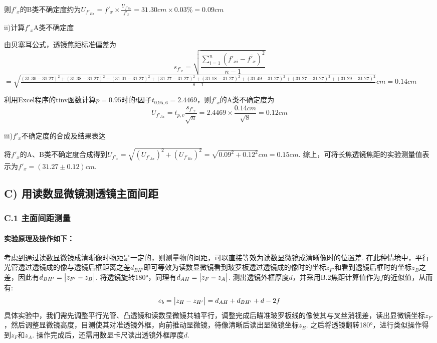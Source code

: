 \documentclass[UTF8]{ctexart}
\begin{document}
 则$f'_x$的B类不确定度约为$U_{f'_{Bx}}=f'_x\times \frac{U_{f'_{Bx}}}{f'_x}=31.30cm\times0.03\%=0.09cm$\\\par
 ii)计算$f'_x$A类不确定度\par 
由贝塞耳公式，透镜焦距标准偏差为
\[s_{f'_x}=\sqrt{\frac{\sum_{i=1}^{n}(f'_{xi}-\overline{f'_x})^2}{n-1}}\]
{\quad\small{$=\sqrt{\frac{(31.30-31.27)^2+(31.38-31.27)^2+(31.01-31.27)^2+(31.27-31.27)^2+(31.18-31.27)^2+(31.49-31.27)^2+(31.27-31.27)^2+(31.29-31.27)^2}{8-1}}cm=0.14cm$}}\par\vspace{0.5em}
利用Excel程序的tinv函数计算$p = 0.95$时的$t$因子$t_{0.95,6}=2.4469$，则$f'_x$的A类不确定度为\[U_{f'_{Ax}}=t_{p,v}\frac{s_{f'_x}}{\sqrt{n}}=2.4469\times\frac{0.14cm}{\sqrt{8}}=0.12cm\]\par
iii)$f'_x$不确定度的合成及结果表达\par
将$f'_x$的A、B类不确定度合成得到$\displaystyle{U_{f'_{x}}=\sqrt{(U_{f'_{Ax}})^2+(U_{f'_{Bx}})^2}=\sqrt{0.09^2+0.12^2}cm=0.15cm}$. 综上，可将长焦透镜焦距的实验测量值表示为$f'_x=(31.27\pm0.12)cm$.

\subsection*{ C) 用读数显微镜测透镜主面间距}
\subsubsection*{C.1 主面间距测量}
\paragraph{实验原理及操作如下：}\quad\par
考虑到通过读数显微镜成清晰像时物距是一定的，则测量物的间距，可以直接等效为读数显微镜成清晰像时的位置差. 在此种情境中，平行光管透过透镜成的像与透镜后框距离之差$d_{BH'}$即可等效为读数显微镜看到玻罗板透过透镜成的像时的坐标$z_{F'}$和看到透镜后框时的坐标$z_{B}$之差，因此有$d_{BH'}=\big{|}z_{F'}-z_{B}\big{|}$. 将透镜旋转180°，同理有$d_{AH}=\big{|}z_{F}-z_{A}\big{|}$. 测出透镜外框厚度$d$，并采用B.2焦距计算值作为$f$的近似值，从而有:
\begin{equation}
    \label{e_b}
    e_b=\big{|}z_H-z_{H'}\big{|}=d_{AH}+d_{BH'}+d-2f
\end{equation}
具体实验中，我们需先调整平行光管、凸透镜和读数显微镜共轴平行，调整完成后瞄准玻罗板线的像使其与叉丝消视差，读出显微镜坐标$z_{F'}$，然后调整显微镜高度，目测使其对准透镜外框，向前推动显微镜，待像清晰后读出显微镜坐标$z_{B}$. 之后将透镜翻转180°，进行类似操作得到$z_{F}$和$z_{A}$. 操作完成后，还需用数显卡尺读出透镜外框厚度$d$.
\end{document}
